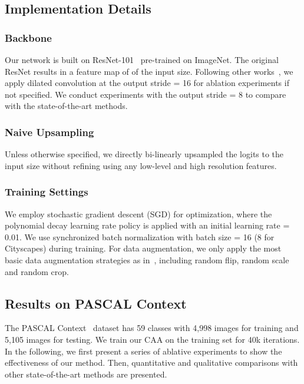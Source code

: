 \documentclass[letterpaper]{article} \usepackage{aaai22}  \usepackage{times}  \usepackage{helvet}  \usepackage{courier}  \usepackage[hyphens]{url}  \usepackage{graphicx} \urlstyle{rm} \def\UrlFont{\rm}  \usepackage{natbib}  \usepackage{caption} \DeclareCaptionStyle{ruled}{labelfont=normalfont,labelsep=colon,strut=off} \frenchspacing  \setlength{\pdfpagewidth}{8.5in}  \setlength{\pdfpageheight}{11in}  \usepackage{algorithm}
\begin{document}
\subsection{Implementation Details}

\subsubsection{Backbone} 
Our network is built on ResNet-101~\cite{cResnet} pre-trained on ImageNet. 
The original ResNet results in a feature map of  of the input size. 
Following other works~\cite{cDeepLabV3Plus, cEMANet}, we apply dilated convolution at the output stride = 16 for ablation experiments if not specified. We conduct experiments with the output stride = 8 to compare with the state-of-the-art methods.

\subsubsection{Naive Upsampling} Unless otherwise specified, we directly bi-linearly upsampled the logits to the input size without refining using any low-level and high resolution features.

\subsubsection{Training Settings} 
We employ stochastic gradient descent (SGD) for optimization, where the polynomial decay learning rate policy  is applied with an initial learning rate = 0.01. We use synchronized batch normalization with batch size = 16 (8 for Cityscapes) during training.
For data augmentation, we only apply the most basic data augmentation strategies as in~\cite{cDeepLabV3Plus}, including random flip, random scale and random crop.

\subsection{Results on PASCAL Context}
\label{expAblation}

The PASCAL Context~\cite{cPascalContext} dataset has 59 classes with 4,998 images for training and 5,105 images for testing. 
We train our CAA on the training set for 40k iterations.
In the following, we first present a series of ablative experiments to show the effectiveness of our method. 
Then, quantitative and qualitative comparisons with other state-of-the-art methods are presented.
\end{document}
